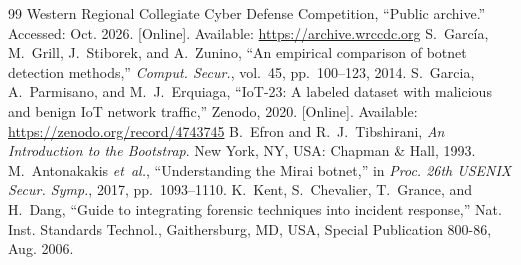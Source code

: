 \documentclass[conference]{IEEEtran}
\begin{document}
\begin{thebibliography}{99}
 Western Regional Collegiate Cyber Defense Competition, ``Public archive.'' Accessed: Oct. 2026. [Online]. Available: \url{https://archive.wrccdc.org}
 S.~Garc\'ia, M.~Grill, J.~Stiborek, and A.~Zunino, ``An empirical comparison of botnet detection methods,'' \emph{Comput. Secur.}, vol.~45, pp.~100--123, 2014.
 S.~Garcia, A.~Parmisano, and M.~J.~Erquiaga, ``IoT-23: A labeled dataset with malicious and benign IoT network traffic,'' Zenodo, 2020. [Online]. Available: \url{https://zenodo.org/record/4743745}
 B.~Efron and R.~J.~Tibshirani, \emph{An Introduction to the Bootstrap}. New York, NY, USA: Chapman \& Hall, 1993.
 M.~Antonakakis \emph{et~al.}, ``Understanding the Mirai botnet,'' in \emph{Proc. 26th USENIX Secur. Symp.}, 2017, pp.~1093--1110.
 K.~Kent, S.~Chevalier, T.~Grance, and H.~Dang, ``Guide to integrating forensic techniques into incident response,'' Nat. Inst. Standards Technol., Gaithersburg, MD, USA, Special Publication 800-86, Aug. 2006.
\end{thebibliography}
\end{document}
